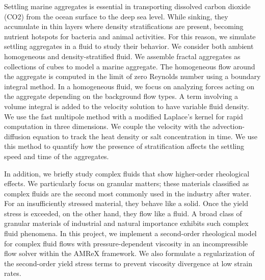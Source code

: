 \par
Settling marine aggregates is essential in transporting dissolved carbon dioxide (CO2) from the ocean surface to the deep sea level. While sinking, they accumulate in thin layers where density stratifications are present, becoming nutrient hotspots for bacteria and animal activities. For this reason, we simulate settling aggregates in a fluid to study their behavior. We consider both ambient homogeneous and density-stratified fluid. We assemble fractal aggregates as collections of cubes to model a marine aggregate. The homogeneous flow around the aggregate is computed in the limit of zero Reynolds number using a boundary integral method. 
In a homogeneous fluid, we focus on analyzing forces acting on the aggregate depending on the background flow types. 
A term involving a volume integral is added to the velocity solution to have variable fluid density. We use the fast multipole method with a modified Laplace's kernel for rapid computation in three dimensions. We couple the velocity with the advection-diffusion equation to track the heat density or salt concentration in time. We use this method to quantify how the presence of stratification affects the settling speed and time of the aggregates.
\par
In addition, we briefly study complex fluids that show higher-order rheological effects. 
We particularly focus on granular matters; these materials classified as complex fluids are the second most commonly used in the industry after water. For an insufficiently stressed material, they behave like a solid. Once the yield stress is exceeded, on the other hand, they flow like a fluid. A broad class of granular materials of industrial and natural importance exhibits such complex fluid phenomena. In this project, we implement a second-order rheological model for complex fluid flows with pressure-dependent viscosity in an incompressible flow solver within the AMReX framework. We also formulate a regularization of the second-order yield stress terms to prevent viscosity divergence at low strain rates.